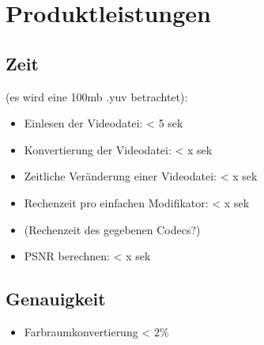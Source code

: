 \section{Produktleistungen}

\subsection{Zeit} (es wird eine 100mb .yuv betrachtet):
\begin{itemize}
	\item Einlesen der Videodatei: < 5 sek
	\item Konvertierung der Videodatei: < x sek
	\item Zeitliche Veränderung einer Videodatei: < x sek 
	\item Rechenzeit pro einfachen Modifikator: < x sek
	\item (Rechenzeit des gegebenen Codecs?) 
	\item PSNR berechnen: < x sek
\end{itemize}

\subsection{Genauigkeit}
\begin{itemize}
	\item Farbraumkonvertierung < 2\%
\end{itemize}